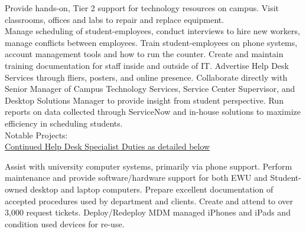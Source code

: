 \documentclass[]{deedy-resume-openfont}
\begin{document}
\begin{minipage}[t]{0.75\textwidth}
\sectionsep
{}
Provide hands-on, Tier 2 support for technology resources on campus. Visit classrooms, offices and labs to repair and replace equipment.
\sectionsep \\
Manage scheduling of student-employees, conduct interviews to hire new workers, manage conflicts between employees. Train student-employees on phone systems, account management tools and how to run the counter. Create and maintain training documentation for staff inside and outside of IT. Advertise Help Desk Services through fliers, posters, and online presence. Collaborate directly with Senior Manager of Campus Technology Services, Service Center Supervisor, and Desktop Solutions Manager to provide insight from student perspective. Run reports on data collected through ServiceNow and in-house solutions to maximize efficiency in scheduling students. 
\\Notable Projects:\\
\underline{Continued Help Desk Specialist Duties as detailed below}\\ 

\sectionsep

Assist with university computer systems, primarily via phone support. Perform maintenance and provide software/hardware support for both EWU and Student-owned desktop and laptop computers. Prepare excellent documentation of accepted procedures used by department and clients. Create and attend to over 3,000 request tickets. Deploy/Redeploy MDM managed iPhones and iPads and condition used devices for re-use.


\end{minipage}
\end{document}
